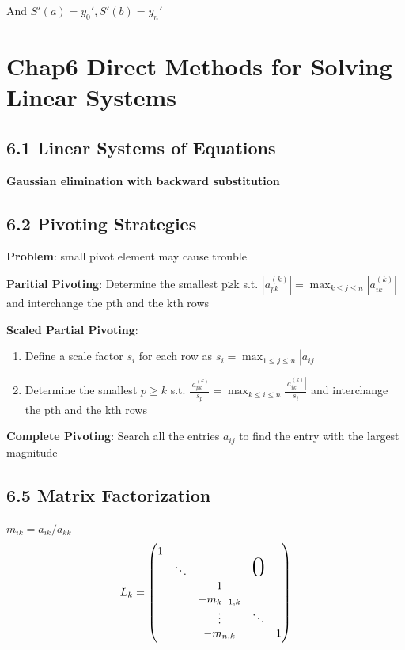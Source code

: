 \documentclass[11pt]{article}
\begin{document}
    And \(S'(a)=y_0',S'(b)=y_n'\)

    \section{Chap6 Direct Methods for Solving Linear Systems}
    \label{sec:orgd8293a7}
    \subsection{6.1 Linear Systems of Equations}
    \label{sec:org3258375}
    \textbf{Gaussian elimination with backward substitution}
    \subsection{6.2 Pivoting Strategies}
    \label{sec:org07a6318}
    \textbf{Problem}: small pivot element may cause trouble

    \textbf{Paritial Pivoting}: Determine the smallest p≥k s.t.
    \(|a_{pk}^{(k)}|=\displaystyle\max_{k\le j\le n}|a_{ik}^{(k)}|\) and
    interchange the pth and the kth rows

    \textbf{Scaled Partial Pivoting}:
    \begin{enumerate}
    \item Define a scale factor \(s_i\) for each row as \(s_i=\displaystyle\max_{1\le
        j\le n}|a_{ij}|\)
    \item Determine the smallest \(p\ge k\) s.t.
      \(\frac{|a_{pk}^{(k)}}{s_p}=\displaystyle\max_{k\le i\le
        n}\frac{|a_{ik}^{(k)}|}{s_i}\)
      and interchange the pth and the kth rows
    \end{enumerate}


    \textbf{Complete Pivoting}: Search all the entries \(a_{ij}\) to find the entry with
    the largest magnitude
    \subsection{6.5 Matrix Factorization}
    \label{sec:org33daf6e}
    \(m_{ik}=a_{ik}/a_{kk}\)
    \begin{equation*}
      L_k=
      \begin{pmatrix}
        1 &            &            &               &  \\
        & \ddots     &            &\mbox{\Huge 0} &  \\
        &            & 1          &               &  \\
        &            & -m_{k+1,k} &               &  \\
        &            & \vdots     & \ddots        &  \\
        &            & -m_{n,k}   &               & 1\\
      \end{pmatrix}
    \end{equation*}  
\end{document}
